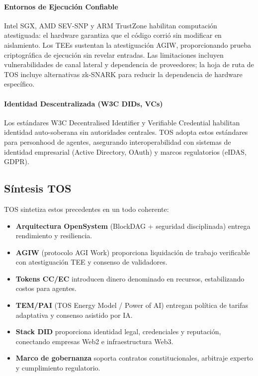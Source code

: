 \documentclass[11pt]{article}
\begin{document}
\paragraph{Entornos de Ejecución Confiable} Intel SGX, AMD SEV-SNP y ARM TrustZone habilitan computación atestiguada: el hardware garantiza que el código corrió sin modificar en aislamiento. Los TEEs sustentan la atestiguación AGIW, proporcionando prueba criptográfica de ejecución sin revelar entradas. Las limitaciones incluyen vulnerabilidades de canal lateral y dependencia de proveedores; la hoja de ruta de TOS incluye alternativas zk-SNARK para reducir la dependencia de hardware específico.

\paragraph{Identidad Descentralizada (W3C DIDs, VCs)} Los estándares W3C Decentralised Identifier y Verifiable Credential habilitan identidad auto-soberana sin autoridades centrales. TOS adopta estos estándares para personhood de agentes, asegurando interoperabilidad con sistemas de identidad empresarial (Active Directory, OAuth) y marcos regulatorios (eIDAS, GDPR).

\subsection{Síntesis TOS}
TOS sintetiza estos precedentes en un todo coherente:
\begin{itemize}[noitemsep]
  \item \textbf{Arquitectura OpenSystem} (BlockDAG + seguridad disciplinada) entrega rendimiento y resiliencia.
  \item \textbf{AGIW} (protocolo AGI Work) proporciona liquidación de trabajo verificable con atestiguación TEE y consenso de validadores.
  \item \textbf{Tokens CC/EC} introducen dinero denominado en recursos, estabilizando costos para agentes.
  \item \textbf{TEM/PAI} (TOS Energy Model / Power of AI) entregan política de tarifas adaptativa y consenso asistido por IA.
  \item \textbf{Stack DID} proporciona identidad legal, credenciales y reputación, conectando empresas Web2 e infraestructura Web3.
  \item \textbf{Marco de gobernanza} soporta contratos constitucionales, arbitraje experto y cumplimiento regulatorio.
\end{itemize}
\end{document}

